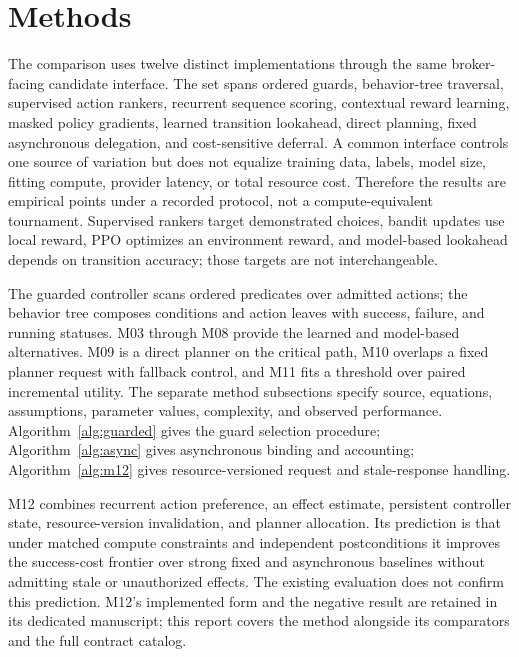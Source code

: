 \section{Methods}
The comparison uses twelve distinct implementations through the same broker-facing candidate interface. The set spans ordered guards, behavior-tree traversal, supervised action rankers, recurrent sequence scoring, contextual reward learning, masked policy gradients, learned transition lookahead, direct planning, fixed asynchronous delegation, and cost-sensitive deferral. A common interface controls one source of variation but does not equalize training data, labels, model size, fitting compute, provider latency, or total resource cost. Therefore the results are empirical points under a recorded protocol, not a compute-equivalent tournament. Supervised rankers target demonstrated choices, bandit updates use local reward, PPO optimizes an environment reward, and model-based lookahead depends on transition accuracy; those targets are not interchangeable.

The guarded controller scans ordered predicates over admitted actions; the behavior tree composes conditions and action leaves with success, failure, and running statuses. M03 through M08 provide the learned and model-based alternatives. M09 is a direct planner on the critical path, M10 overlaps a fixed planner request with fallback control, and M11 fits a threshold over paired incremental utility. The separate method subsections specify source, equations, assumptions, parameter values, complexity, and observed performance. Algorithm~\ref{alg:guarded} gives the guard selection procedure; Algorithm~\ref{alg:async} gives asynchronous binding and accounting; Algorithm~\ref{alg:m12} gives resource-versioned request and stale-response handling.

M12 combines recurrent action preference, an effect estimate, persistent controller state, resource-version invalidation, and planner allocation. Its prediction is that under matched compute constraints and independent postconditions it improves the success-cost frontier over strong fixed and asynchronous baselines without admitting stale or unauthorized effects. The existing evaluation does not confirm this prediction. M12's implemented form and the negative result are retained in its dedicated manuscript; this report covers the method alongside its comparators and the full contract catalog.



